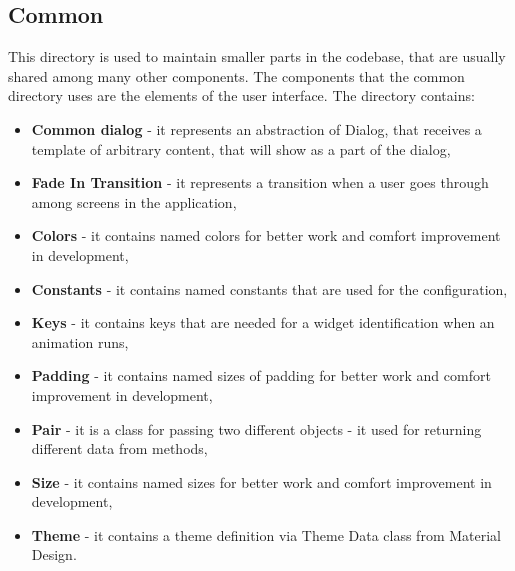\subsection{Common}\label{subsec:common}
This directory is used to maintain smaller parts in the codebase, that are usually shared among many other components.
The components that the common directory uses are the elements of the user interface.
The directory contains:
\begin{itemize}
    \item \textbf{Common dialog} - it represents an abstraction of Dialog, that receives a template of arbitrary content, that will show as a part of the dialog,
    \item \textbf{Fade In Transition} - it represents a transition when a user goes through among screens in the application,
    \item \textbf{Colors} - it contains named colors for better work and comfort improvement in development,
    \item \textbf{Constants} - it contains named constants that are used for the configuration,
    \item \textbf{Keys} - it contains keys that are needed for a widget identification when an animation runs,
    \item \textbf{Padding} - it contains named sizes of padding for better work and comfort improvement in development,
    \item \textbf{Pair} - it is a class for passing two different objects - it used for returning different data from methods,
    \item \textbf{Size} - it contains named sizes for better work and comfort improvement in development,
    \item \textbf{Theme} - it contains a theme definition via Theme Data class from Material Design.
\end{itemize}
